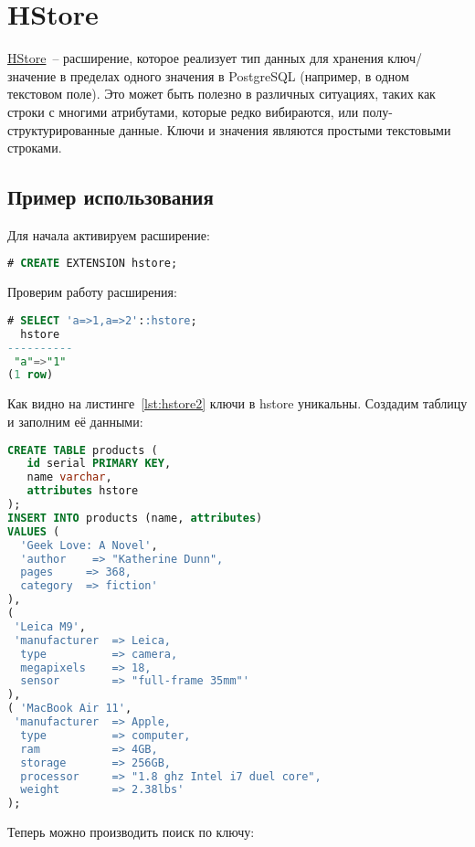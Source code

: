 \section{HStore}

\href{https://www.postgresql.org/docs/current/static/hstore.html}{HStore}~-- расширение, которое реализует тип данных для хранения ключ/значение в пределах одного значения в PostgreSQL (например, в одном текстовом поле). Это может быть полезно в различных ситуациях, таких как строки с многими атрибутами, которые редко вибираются, или полу-структурированные данные. Ключи и значения являются простыми текстовыми строками.

\subsection{Пример использования}

Для начала активируем расширение:

\begin{lstlisting}[language=SQL,label=lst:hstore1,caption=Активация hstore]
# CREATE EXTENSION hstore;
\end{lstlisting}

Проверим работу расширения:

\begin{lstlisting}[language=SQL,label=lst:hstore2,caption=Проверка hstore]
# SELECT 'a=>1,a=>2'::hstore;
  hstore
----------
 "a"=>"1"
(1 row)
\end{lstlisting}

Как видно на листинге~\ref{lst:hstore2} ключи в hstore уникальны. Создадим таблицу и заполним её данными:

\begin{lstlisting}[language=SQL,label=lst:hstore3,caption=Проверка hstore]
CREATE TABLE products (
   id serial PRIMARY KEY,
   name varchar,
   attributes hstore
);
INSERT INTO products (name, attributes)
VALUES (
  'Geek Love: A Novel',
  'author    => "Katherine Dunn",
  pages     => 368,
  category  => fiction'
),
(
 'Leica M9',
 'manufacturer  => Leica,
  type          => camera,
  megapixels    => 18,
  sensor        => "full-frame 35mm"'
),
( 'MacBook Air 11',
 'manufacturer  => Apple,
  type          => computer,
  ram           => 4GB,
  storage       => 256GB,
  processor     => "1.8 ghz Intel i7 duel core",
  weight        => 2.38lbs'
);
\end{lstlisting}

Теперь можно производить поиск по ключу:

